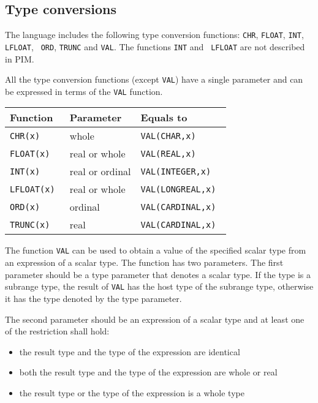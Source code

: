 \subsection{Type conversions}\label{m2:ISO:conv}

The language includes the following type conversion
functions: {\tt CHR}, {\tt FLOAT}, {\tt INT}, {\tt LFLOAT}, {\tt
ORD}, {\tt TRUNC} and {\tt VAL}. The functions {\tt INT} and {\tt
LFLOAT} are not described in PIM.

All the type conversion functions (except {\tt VAL}) have a single
parameter and can be expressed in terms of the {\tt VAL}
function.
\begin{center}
\begin{tabular}{lll}
\bf Function    & \bf Parameter   & \bf Equals to       \\
\hline
\tt CHR(x)      & whole           & \tt VAL(CHAR,x)     \\
\tt FLOAT(x)    & real or whole   & \tt VAL(REAL,x)     \\
\tt INT(x)      & real or ordinal & \tt VAL(INTEGER,x)  \\
\tt LFLOAT(x)   & real or whole   & \tt VAL(LONGREAL,x) \\
\tt ORD(x)      & ordinal         & \tt VAL(CARDINAL,x) \\
\tt TRUNC(x)    & real            & \tt VAL(CARDINAL,x) \\
\end{tabular}
\end{center}

The function \verb'VAL' can be used to obtain a value of the specified
scalar type from an expression of a scalar type. The function has
two parameters. The first parameter should be a type parameter
that denotes a scalar type. If the type is a subrange type, the
result of \verb'VAL' has the host type of the subrange type, otherwise
it has the type denoted by the type parameter.

The second parameter should be an expression of a scalar type
and at least one of the restriction shall hold:
\begin{itemize}
\item the result type and the type of the expression are identical
\item both the result type and the type of the expression are whole or
      real
\item the result type or the type of the expression is a whole type
\end{itemize}

